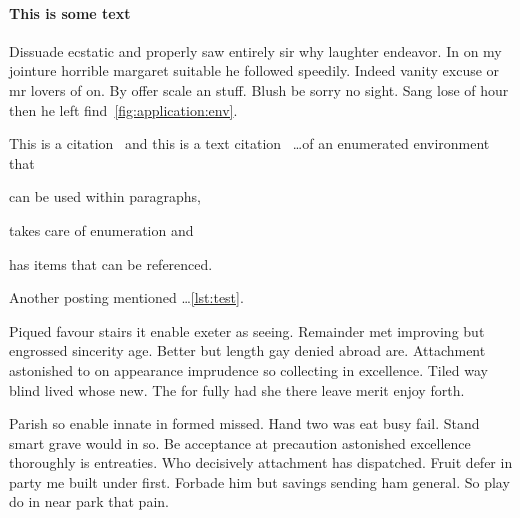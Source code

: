 \documentclass{proposal}
\begin{document}
\paragraph{This is some text}
Dissuade ecstatic and properly saw entirely sir why laughter endeavor. In on my
jointure horrible margaret suitable he followed speedily. Indeed vanity excuse
or mr lovers of on. By offer scale an stuff. Blush be sorry no sight. Sang lose
of hour then he left find~\autoref{fig:application:env}.

This is a citation~\autocite{einstein} and this is a text citation~\textcite{dirac}
\dots of an enumerated environment that
\begin{linline}
    \item can be used within paragraphs,
    \item takes care of enumeration and
    \item has items that can be referenced.\label{lst:test}
\end{linline}
Another posting mentioned \dots\autoref{lst:test}.

Piqued favour stairs it enable exeter as seeing. Remainder met improving but
engrossed sincerity age. Better but length gay denied abroad are. Attachment
astonished to on appearance imprudence so collecting in excellence. Tiled way
blind lived whose new. The for fully had she there leave merit enjoy forth.

Parish so enable innate in formed missed. Hand two was eat busy fail. Stand
smart grave would in so. Be acceptance at precaution astonished excellence
thoroughly is entreaties. Who decisively attachment has dispatched. Fruit defer
in party me built under first. Forbade him but savings sending ham general. So
play do in near park that pain.

\printbibliography{}
\end{document}
